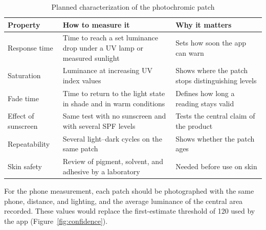 \begin{table}[ht]
\centering\small
\caption{Planned characterization of the photochromic patch}\label{tab:photochromic-plan}
\begin{tabular}{@{}L{3.6cm}L{6.4cm}L{4.1cm}@{}}
  \toprule
  \textbf{Property} & \textbf{How to measure it} & \textbf{Why it matters}\\
  \midrule
  Response time & Time to reach a set luminance drop under a UV lamp or measured sunlight & Sets how soon the app can warn\\
  \addlinespace
  Saturation & Luminance at increasing UV index values & Shows where the patch stops distinguishing levels\\
  \addlinespace
  Fade time & Time to return to the light state in shade and in warm conditions & Defines how long a reading stays valid\\
  \addlinespace
  Effect of sunscreen & Same test with no sunscreen and with several SPF levels & Tests the central claim of the product\\
  \addlinespace
  Repeatability & Several light--dark cycles on the same patch & Shows whether the patch ages\\
  \addlinespace
  Skin safety & Review of pigment, solvent, and adhesive by a laboratory & Needed before use on skin\\
  \bottomrule
\end{tabular}
\end{table}

For the phone measurement, each patch should be photographed with the same phone, distance, and
lighting, and the average luminance of the central area recorded. These values would replace the
first-estimate threshold of 120 used by the app (Figure~\ref{fig:confidence}).
